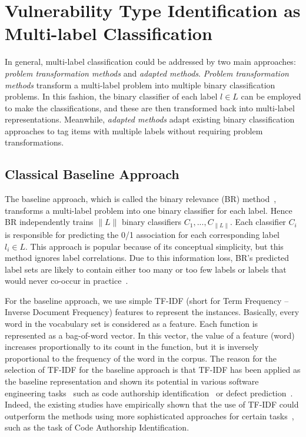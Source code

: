 \section{Vulnerability Type Identification as Multi-label Classification}
\label{sec:approaches}
%
%
%
In general, multi-label classification could be addressed by two main approaches: \textit{problem transformation methods} and \textit{adapted methods}. \textit{Problem transformation methods} transform a multi-label problem into multiple binary classification problems. In this fashion, the binary classifier of each label $l \in L$ can be employed to make the classifications, and these are then transformed back into multi-label representations.
%
Meanwhile, \textit{adapted methods} adapt existing binary classification approaches to tag items with multiple labels without requiring problem transformations.


\subsection{Classical Baseline Approach}
The baseline approach, which is called the binary relevance (BR) method~\citep{brm}, transforms a multi-label problem into one binary classifier for each label. Hence BR independently trains $\|L\|$ binary classifiers $C_1,... , C_{\|L\|}$. Each classifier $C_i$ is responsible for predicting the 0/1 association for each corresponding label $l_i \in L$.
This approach is popular because of its conceptual simplicity, but this method ignores label correlations. Due to this information loss, BR's predicted label sets are likely to contain either too many or too few labels or labels that would never co-occur in practice~\cite{brm}.

For the baseline approach, we use simple TF-IDF (short for Term Frequency – Inverse Document Frequency) features to represent the instances. Basically, every word in the vocabulary set is considered as a feature. Each function is represented as a bag-of-word vector. In this vector, the value of a feature (word) increases proportionally to its count in the function, but it is inversely proportional to the frequency of the word in the corpus. 
The reason for the selection of TF-IDF for the baseline approach is that TF-IDF has been applied as the baseline representation and shown its potential in various software engineering tasks~\citep{embedding_emse22,embedding_icse19} such as code authorship identification~\citep{authorship} or defect prediction~\citep{defect_prediction_paper}. 
Indeed, the existing studies have empirically shown that the use of TF-IDF could outperform the methods using more sophisticated approaches for certain tasks~\cite{embedding_emse22,embedding_icse19}, such as the task of Code Authorship Identification.


